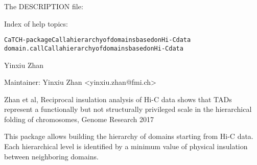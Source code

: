 \documentclass[letterpaper]{book}
\begin{document}
\begin{Details}\relax

The DESCRIPTION file:


Index of help topics:
\begin{alltt}
CaTCH-package           Call a hierarchy of domains based on Hi-C data
domain.call             Call a hierarchy of domains based on Hi-C data
\end{alltt}

\end{Details}
%
\begin{Author}\relax
Yinxiu Zhan

Maintainer: Yinxiu Zhan <yinxiu.zhan@fmi.ch>
\end{Author}
%
\begin{References}\relax
Zhan et al, Reciprocal insulation analysis of Hi-C data shows that TADs represent a functionally but not structurally privileged scale in the hierarchical folding of chromosomes, Genome Research 2017
\end{References}
%
\begin{Description}\relax
This package allows building the hierarchy of domains
starting from Hi-C data. Each hierarchical level is identified
by a minimum value of physical insulation between
neighboring domains.
\end{Description}
\end{document}
